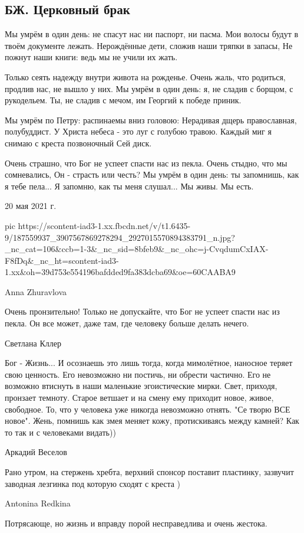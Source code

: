  
 
 
 
 
\subsection{БЖ. Церковный брак}
\label{sec:20_05_2021.fb.bilchenko_evgenia.1.cerkovnyj_brak}

Мы умрём в один день: не спасут нас ни паспорт, ни пасма.
Мои волосы будут в твоём документе лежать.
Нерождённые дети, сложив наши тряпки в запасы,
Не пожнут наши книги: ведь мы не учили их жать.

Только сеять надежду внутри живота на рожденье.
Очень жаль, что родиться, продлив нас, не вышло у них.
Мы умрём в один день: я, не сладив с борщом, с рукодельем.
Ты, не сладив с мечом, им Георгий к победе приник.

Мы умрём по Петру: распинаемы вниз головою:
Нерадивая дщерь православная, полубуддист.
У Христа небеса - это луг с голубою травою.
Каждый миг я снимаю с креста позвоночный Сей диск.

Очень страшно, что Бог не успеет спасти нас из пекла.
Очень стыдно, что мы сомневались, Он - страсть или честь?
Мы умрём в один день: ты запомнишь, как я тебе пела...
Я запомню, как ты меня слушал... Мы живы. Мы есть.

20 мая 2021 г.

\ifcmt
  pic https://scontent-iad3-1.xx.fbcdn.net/v/t1.6435-9/187559937_3907567869278294_2927015570894383791_n.jpg?_nc_cat=106&ccb=1-3&_nc_sid=8bfeb9&_nc_ohc=j-CvqdumCxIAX-F8fDq&_nc_ht=scontent-iad3-1.xx&oh=39d753e554196bafdded9fa383dcba69&oe=60CAABA9
\fi

Anna Zhuravlova

Очень пронзительно! Только не допускайте, что Бог не успеет спасти нас из
пекла. Он все может, даже там, где человеку больше делать нечего.

Светлана Кллер

Бог - Жизнь... И осознаешь это лишь тогда, когда мимолётное, наносное теряет
свою ценность. Его невозможно ни постичь, ни обрести частично. Его не возможно
втиснуть в наши маленькие эгоистические мирки. Свет, приходя, пронзает темноту.
Старое ветшает и на смену ему приходит новое, живое, свободное. То, что у
человека уже никогда невозможно отнять. "Се творю ВСЕ новое". Жень, помнишь как
змея меняет кожу, протискиваясь между камней? Как то так и с человеками
видать))

Аркадий Веселов

Рано утром, на стержень хребта, верхний спонсор поставит пластинку, зазвучит
заводная лезгинка под которую сходят с креста )

Antonina Redkina

Потрясающе, но жизнь и вправду порой несправедлива и очень жестока.
